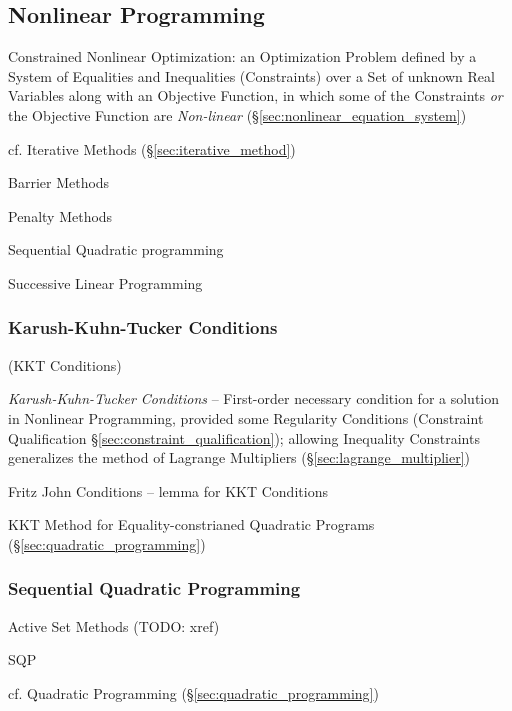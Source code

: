 \subsection{Nonlinear Programming}\label{sec:nonlinear_programming}

Constrained Nonlinear Optimization: an Optimization Problem defined by a System
of Equalities and Inequalities (Constraints) over a Set of unknown Real
Variables along with an Objective Function, in which some of the Constraints
\emph{or} the Objective Function are \emph{Non-linear}
(\S\ref{sec:nonlinear_equation_system})

\fist cf. Iterative Methods (\S\ref{sec:iterative_method})

Barrier Methods

Penalty Methods

Sequential Quadratic programming

Successive Linear Programming



\subsubsection{Karush-Kuhn-Tucker Conditions}\label{sec:karush_kuhn_tucker}

(KKT Conditions)

\emph{Karush-Kuhn-Tucker Conditions} -- First-order necessary condition for a
solution in Nonlinear Programming, provided some Regularity Conditions
(Constraint Qualification \S\ref{sec:constraint_qualification});
allowing Inequality Constraints generalizes the method of Lagrange Multipliers
(\S\ref{sec:lagrange_multiplier})

Fritz John Conditions -- lemma for KKT Conditions

\fist KKT Method for Equality-constrianed Quadratic Programs
(\S\ref{sec:quadratic_programming})



\subsubsection{Sequential Quadratic Programming}
\label{sec:sequential_quadratic_programming}

Active Set Methods (TODO: xref)

SQP

\fist cf. Quadratic Programming (\S\ref{sec:quadratic_programming})



